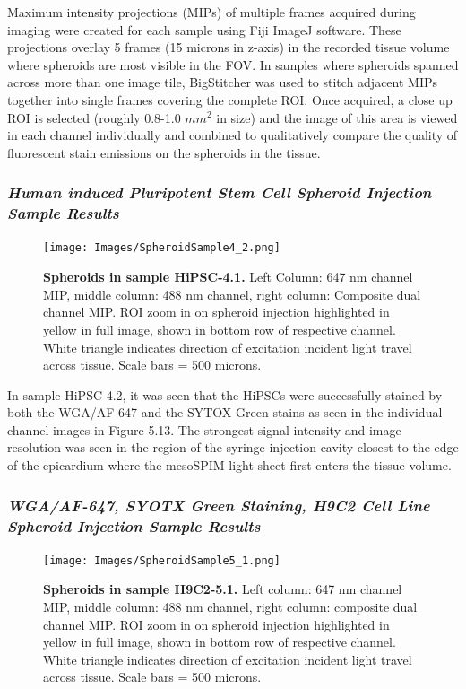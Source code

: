 Maximum intensity projections (MIPs) of multiple frames acquired during imaging were created for each sample using Fiji ImageJ software. These projections overlay 5 frames (15 microns in z-axis) in the recorded tissue volume where spheroids are most visible in the FOV. In samples where spheroids spanned across more than one image tile, BigStitcher was used to stitch adjacent MIPs together into single frames covering the complete ROI. Once acquired, a close up ROI is selected (roughly 0.8-1.0 $mm^2$ in size) and the image of this area is viewed in each channel individually and combined to qualitatively compare the quality of fluorescent stain emissions on the spheroids in the tissue.

\subsubsection{\textit{Human induced Pluripotent Stem Cell Spheroid Injection Sample Results}}


\begin{figure}[H]
\centering
\texttt{[image: Images/SpheroidSample4\_2.png]}
\caption{\textbf{Spheroids in sample HiPSC-4.1.} Left Column: 647 nm channel MIP, middle column: 488 nm channel, right column: Composite dual channel MIP. ROI zoom in on spheroid injection highlighted in yellow in full image, shown in bottom row of respective channel. White triangle indicates direction of excitation incident light travel across tissue. Scale bars = 500 microns.}
\label{spheroids4.2}
\end{figure}

In sample HiPSC-4.2, it was seen that the HiPSCs were successfully stained by both the WGA/AF-647 and the SYTOX Green stains as seen in the individual channel images in Figure 5.13. The strongest signal intensity and image resolution was seen in the region of the syringe injection cavity closest to the edge of the epicardium where the mesoSPIM light-sheet first enters the tissue volume.

\subsubsection{\textit{WGA/AF-647, SYOTX Green Staining, H9C2 Cell Line Spheroid Injection Sample Results}}

\begin{figure}[H]
\centering
\texttt{[image: Images/SpheroidSample5\_1.png]}
\caption{\textbf{Spheroids in sample H9C2-5.1.}  Left column: 647 nm channel MIP, middle column: 488 nm channel, right column: composite dual channel MIP. ROI zoom in on spheroid injection highlighted in yellow in full image, shown in bottom row of respective channel. White triangle indicates direction of excitation incident light travel across tissue.  Scale bars = 500 microns.}
\label{fig:enter-label}
\end{figure}
\medskip

